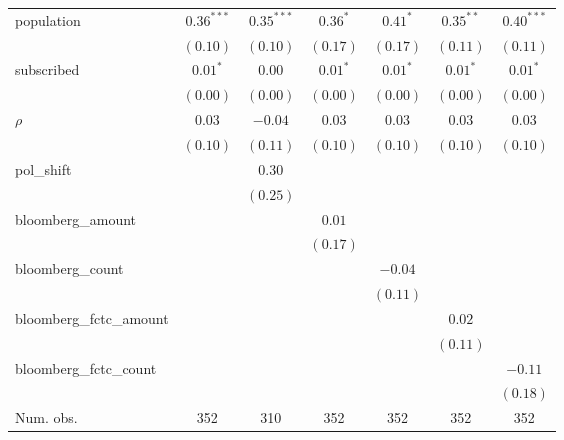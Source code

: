 \begin{table}[!h]
\begin{center}
\begin{tabular}{l c c c c c c }
population              & $0.36^{***}$ & $0.35^{***}$ & $0.36^{*}$   & $0.41^{*}$   & $0.35^{**}$  & $0.40^{***}$ \\
                        & $(0.10)$     & $(0.10)$     & $(0.17)$     & $(0.17)$     & $(0.11)$     & $(0.11)$     \\
subscribed              & $0.01^{*}$   & $0.00$       & $0.01^{*}$   & $0.01^{*}$   & $0.01^{*}$   & $0.01^{*}$   \\
                        & $(0.00)$     & $(0.00)$     & $(0.00)$     & $(0.00)$     & $(0.00)$     & $(0.00)$     \\
$\rho$                  & $0.03$       & $-0.04$      & $0.03$       & $0.03$       & $0.03$       & $0.03$       \\
                        & $(0.10)$     & $(0.11)$     & $(0.10)$     & $(0.10)$     & $(0.10)$     & $(0.10)$     \\
pol\_shift              &              & $0.30$       &              &              &              &              \\
                        &              & $(0.25)$     &              &              &              &              \\
bloomberg\_amount       &              &              & $0.01$       &              &              &              \\
                        &              &              & $(0.17)$     &              &              &              \\
bloomberg\_count        &              &              &              & $-0.04$      &              &              \\
                        &              &              &              & $(0.11)$     &              &              \\
bloomberg\_fctc\_amount &              &              &              &              & $0.02$       &              \\
                        &              &              &              &              & $(0.11)$     &              \\
bloomberg\_fctc\_count  &              &              &              &              &              & $-0.11$      \\
                        &              &              &              &              &              & $(0.18)$     \\
\midrule
Num. obs.               & 352          & 310          & 352          & 352          & 352          & 352          \\

\end{tabular}
\end{center}
\end{table}
